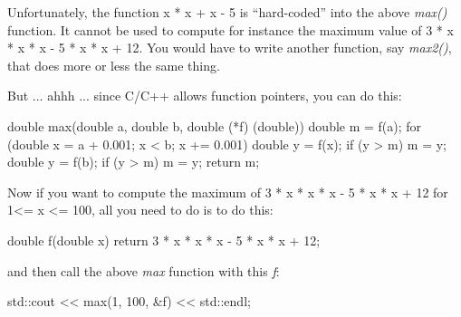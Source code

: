 Unfortunately, the function x * x + x - 5 is ``hard-coded'' into the
above \textit{max()} function. It cannot be used to compute for instance
the maximum value of 3 * x * x * x - 5 * x * x + 12. You would have to
write another function, say \textit{max2()}, that does more or less the
same thing.

But ... ahhh ... since C/C++ allows function pointers, you can
do this:

\begin{consolethree}[escapeinside=||]
double max(double a, double b, double (*f) (double))
{
    double m = f(a);
    for (double x = a + 0.001; x < b; x += 0.001)
    {
        double y = f(x);
        if (y > m)
        {
            m = y;
        }
    }
    double y = f(b);
    if (y > m)
    {
        m = y;
    }
    return m;
}
\end{consolethree}

Now if you want to compute the maximum of 3 * x * x * x - 5 * x * x +
12 for 1<= x <= 100, all you need to do is to do this:

\begin{consolethree}[escapeinside=||]
double f(double x)
{
    return 3 * x * x * x - 5 * x * x + 12;
}
\end{consolethree}

and then call the above \textit{max} function with this \textit{f}:

\begin{consolethree}[escapeinside=||]
std::cout << max(1, 100, &f) << std::endl;
\end{consolethree}






